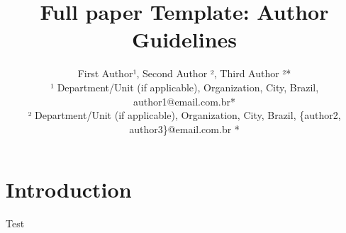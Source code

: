\documentclass[12pt,a4paper]{article}
\title{\vspace{-2em}\fontsize{16pt}{19.2pt}\selectfont\textbf{Full paper Template: Author Guidelines}\vspace{12pt}}
\author{\fontsize{12pt}{14.4pt}\selectfont First Author¹, Second Author ², Third Author ²*\vspace{12pt}\\\fontsize{12pt}{14.4pt}\selectfont ¹ Department/Unit (if applicable), Organization, City, Brazil, author1@email.com.br*\\² Department/Unit (if applicable), Organization, City, Brazil, \{author2, author3\}@email.com.br *}
\date{}
\begin{document}
\maketitle

\section{Introduction}
Test
\end{document}
